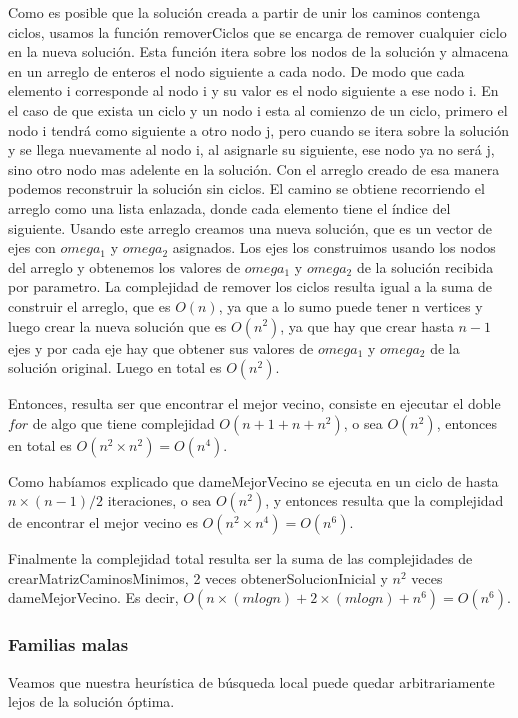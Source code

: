 Como es posible que la solución creada a partir de unir los caminos contenga ciclos, usamos la función removerCiclos que se encarga de remover cualquier ciclo en la nueva solución. Esta función itera sobre los nodos de la solución y almacena en un arreglo de enteros el nodo siguiente a cada nodo. De modo que cada elemento i corresponde al nodo i y su valor es el nodo siguiente a ese nodo i. En el caso de que exista un ciclo y un nodo i esta al comienzo de un ciclo, primero el nodo i tendrá como siguiente a otro nodo j, pero cuando se itera sobre la solución y se llega nuevamente al nodo i, al asignarle su siguiente, ese nodo ya no será j, sino otro nodo mas adelente en la solución. Con el arreglo creado de esa manera podemos reconstruir la solución sin ciclos. El camino se obtiene recorriendo el arreglo como una lista enlazada, donde cada elemento tiene el índice del siguiente. Usando este arreglo creamos una nueva solución, que es un vector de ejes con $omega_1$ y $omega_2$ asignados. Los ejes los construimos usando los nodos del arreglo y obtenemos los valores de $omega_1$ y $omega_2$ de la solución recibida por parametro. La complejidad de remover los ciclos resulta igual a la suma de construir el arreglo, que es $O(n)$, ya que a lo sumo puede tener n vertices y luego crear la nueva solución que es $O(n^2)$, ya que hay que crear hasta $n-1$ ejes y por cada eje hay que obtener sus valores de $omega_1$ y $omega_2$ de la solución original. Luego en total es $O(n^2)$. 

Entonces, resulta ser que encontrar el mejor vecino, consiste en ejecutar el doble $for$ de algo que tiene complejidad $O(n + 1 + n + n^2)$, o sea $O(n^2)$, entonces en total es $O(n^2 \times n^2) = O(n^4)$.

Como habíamos explicado que dameMejorVecino se ejecuta en un ciclo de hasta $n \times (n-1) / 2$ iteraciones, o sea $O(n^2)$, y entonces resulta que la complejidad de encontrar el mejor vecino es $O(n^2 \times n^4) = O(n^6)$. 

Finalmente la complejidad total resulta ser la suma de las complejidades de crearMatrizCaminosMinimos, 2 veces obtenerSolucionInicial y $n^2$ veces dameMejorVecino. Es decir, $O(n \times (m log n) + 2 \times (m log n) + n^6) = O(n^6)$.

\subsubsection{Familias malas}

Veamos que nuestra heurística de búsqueda local puede quedar arbitrariamente lejos de la solución óptima.

